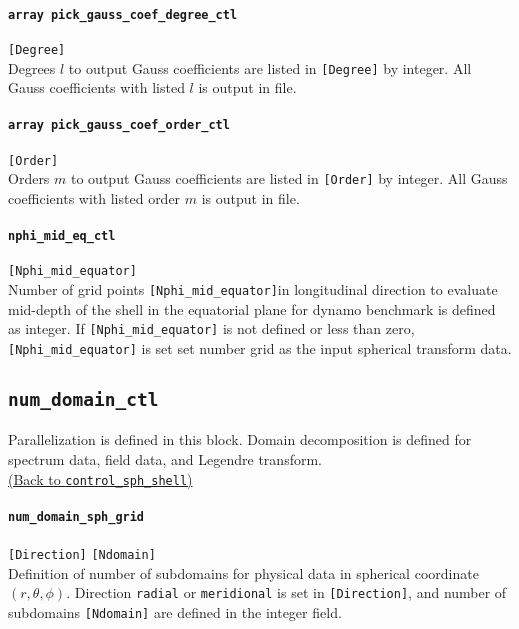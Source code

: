 \paragraph{\tt array pick\_gauss\_coef\_degree\_ctl}
\label{href_t:pick_gauss_coef_degree_ctl}
\verb|[Degree]| \\
Degrees $l$ to output Gauss coefficients are listed in \verb|[Degree]| by integer. All Gauss coefficients with listed $l$ is output in file.

\paragraph{\tt array pick\_gauss\_coef\_order\_ctl}
\label{href_t:pick_gauss_coef_order_ctl}
\verb|[Order]| \\
Orders $m$ to output Gauss coefficients are listed in \verb|[Order]| by integer. All Gauss coefficients with listed order $m$ is output in file.

\paragraph{\tt nphi\_mid\_eq\_ctl}
\label{href_t:nphi_mid_eq_ctl}
\verb|[Nphi_mid_equator]| \\
Number of grid points \verb|[Nphi_mid_equator]|in longitudinal direction to evaluate mid-depth of the shell in the equatorial plane for dynamo benchmark is defined as integer. If \verb|[Nphi_mid_equator]| is not defined or less than zero, \verb|[Nphi_mid_equator]| is set set number grid as the input spherical transform data. 


\subsection{\tt num\_domain\_ctl}
\label{href_t:num_domain_ctl}
Parallelization is defined in this block. Domain decomposition is defined for spectrum data, field data, and Legendre transform. \\
\hyperref[href_i:num_domain_ctl]{(Back to {\tt control\_sph\_shell})}

\paragraph{\tt num\_domain\_sph\_grid}
\label{href_t:num_domain_sph_grid} 
\verb|[Direction]| \verb|[Ndomain]| \\
 Definition of number of subdomains for physical data in spherical coordinate $(r, \theta, \phi)$. Direction {\tt  radial} or {\tt meridional} is set in \verb|[Direction]|, and number of subdomains \verb|[Ndomain]| are defined in the integer field.

